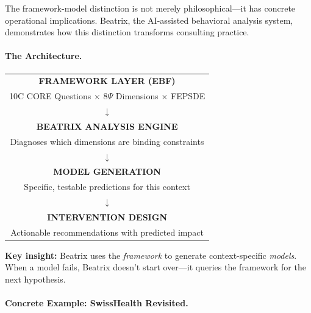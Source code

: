 The framework-model distinction is not merely philosophical---it has concrete
operational implications. Beatrix, the AI-assisted behavioral analysis system,
demonstrates how this distinction transforms consulting practice.

\paragraph{The Architecture.}

\begin{tcolorbox}[colback=purple!5!white, colframe=purple!75!black,
    title=\textbf{Beatrix: Framework-to-Model Generator}]

\begin{center}
\begin{tabular}{@{}c@{}}
\textbf{FRAMEWORK LAYER (EBF)} \\
10C CORE Questions $\times$ 8$\Psi$ Dimensions $\times$ FEPSDE \\
$\downarrow$ \\
\textbf{BEATRIX ANALYSIS ENGINE} \\
Diagnoses which dimensions are binding constraints \\
$\downarrow$ \\
\textbf{MODEL GENERATION} \\
Specific, testable predictions for this context \\
$\downarrow$ \\
\textbf{INTERVENTION DESIGN} \\
Actionable recommendations with predicted impact \\
\end{tabular}
\end{center}

\textbf{Key insight:} Beatrix uses the \textit{framework} to generate context-specific \textit{models}.
When a model fails, Beatrix doesn't start over---it queries the framework for the next hypothesis.

\end{tcolorbox}

\paragraph{Concrete Example: SwissHealth Revisited.}

